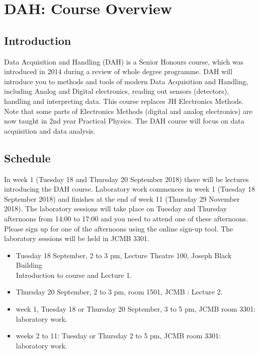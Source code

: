 \chapter{DAH: Course Overview}
\label{sec:overview}

\section{Introduction}

Data Acquisition and Handling (DAH) is a  Senior Honours course, which was introduced in 2014 during a review of whole degree programme. DAH will introduce you to methods and tools of modern Data Acquisition and Handling, including Analog and Digital electronics, reading out sensors (detectors), handling and interpreting data. This course replaces JH Electronics Methods. Note that some parts of Electronics Methods (digital and analog electronics) are now taught in 2nd year Practical Physics. The DAH course will focus on data acquisition and data analysis.


\section{Schedule}
In week 1 (Tuesday 18 and Thursday 20 September 2018)
there will be lectures %
introducing the DAH course.
Laboratory work commences in week 1 (Tuesday 18 September 2018) and finishes at the end of week 11 (Thursday 29 November 2018). The laboratory sessions will take place on Tuesday and Thursday afternoons from 14:00 to 17:00 and you need to attend one of these afternoons. Please sign up for one of the afternoons using the online sign-up tool. The laboratory sessions will be held in JCMB 3301.
\begin{itemize}
\item Tuesday 18 September, 2 to 3 pm,  Lecture Theatre 100, Joseph Black Building \\Introduction to course and Lecture 1.
\item Thursday 20 September, 2 to 3 pm, room  1501, JCMB : Lecture 2.
\item week 1, Tuesday 18  or Thursday  20 September, 3 to 5 pm, JCMB room 3301: \\laboratory work.
\item weeks 2 to 11:  Tuesday or Thursday 2 to 5 pm, JCMB room 3301: \\laboratory work.
\end{itemize}




